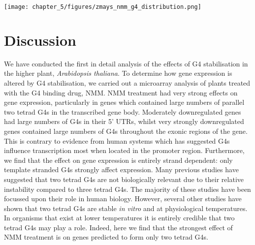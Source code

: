 \documentclass[12pt,a4paper,]{report}
\let\origfigure=\figure
\let\endorigfigure=\endfigure
\renewenvironment{figure}[1][2] {
    \expandafter\origfigure\expandafter[H]
} {
    \endorigfigure
}
\begin{document}
\newpage

\begin{figure}[htbp]
\centering
\texttt{[image: chapter\_5/figures/zmays\_nmm\_g4\_distribution.png]}
\caption[Distribution of Two tetrad PG4s in \textit{Z. mays} genes regulated by NMM]{\textbf{Distribution   of   Two   tetrad   PG4s   in   \textit{Z.   mays}   genes   regulated   by   NMM}   Bar   plots   showing   the   average   PG4   densities   of   \textit{Z.   mays}   genes   up   or   downregulated   by   NMM,   for   \textbf{a)}   CDSs,   \textbf{b)}   5’   UTRs   and   \textbf{c)}   introns,   respectively.   In   each   figure,   left   and   right   panels   represent   coding   and   template   strand,   respectively.   Errorbars   are   68\%   confidence   intervals   for   bootstrapped   means.   \label{maize_pg4}}
\end{figure}

\newpage

\hypertarget{discussion-1}{%
\section{Discussion}\label{discussion-1}}

We have conducted the first in detail analysis of the effects of G4
stabilisation in the higher plant, \emph{Arabidopsis thaliana}. To
determine how gene expression is altered by G4 stabilisation, we carried
out a microarray analysis of plants treated with the G4 binding drug,
NMM. NMM treatment had very strong effects on gene expression,
particularly in genes which contained large numbers of parallel two
tetrad G4s in the transcribed gene body. Moderately downregulated genes
had large numbers of G4s in their 5' UTRs, whilst very strongly
downregulated genes contained large numbers of G4s throughout the exonic
regions of the gene. This is contrary to evidence from human systems
which has suggested G4s influence transcription most when located in the
promoter region. Furthermore, we find that the effect on gene expression
is entirely strand dependent: only template stranded G4s strongly affect
expression. Many previous studies have suggested that two tetrad G4s are
not biologically relevant due to their relative instability compared to
three tetrad G4s. The majority of these studies have been focussed upon
their role in human biology. However, several other studies have shown
that two tetrad G4s are stable \emph{in vitro} and at physiological
temperatures. In organisms that exist at lower temperatures it is
entirely credible that two tetrad G4s may play a role. Indeed, here we
find that the strongest effect of NMM treatment is on genes predicted to
form only two tetrad G4s.
\end{document}
